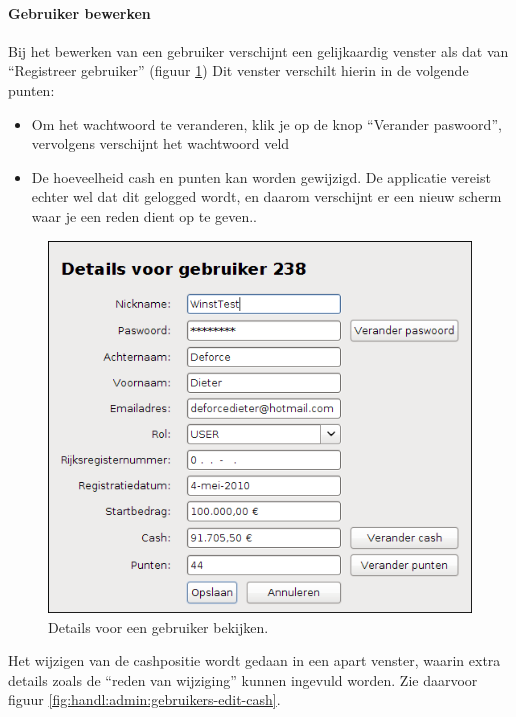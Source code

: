 \paragraph{Gebruiker bewerken}

Bij het bewerken van een gebruiker verschijnt een gelijkaardig venster als dat van ``Registreer gebruiker'' (figuur \ref{fig:handl:admin:gebruikers-edit})
Dit venster verschilt hierin in de volgende punten:

\begin{itemize}
\item{Om het wachtwoord te veranderen, klik je op de knop ``Verander paswoord'', vervolgens verschijnt het wachtwoord veld}
\item{De hoeveelheid cash en punten kan worden gewijzigd. De applicatie vereist echter wel dat dit gelogged wordt, en daarom verschijnt er een nieuw scherm waar je een reden dient op te geven..}
\end{itemize}

\begin{figure}[h!]
	\centering
		\includegraphics[scale=0.75]{images/handleiding/administratie/gebruikers-edit}
	\caption{Details voor een gebruiker bekijken.}
		\label{fig:handl:admin:gebruikers-edit}
\end{figure}

Het wijzigen van de cashpositie wordt gedaan in een apart venster, waarin extra details zoals de ``reden van wijziging'' kunnen ingevuld worden. Zie daarvoor figuur \ref{fig:handl:admin:gebruikers-edit-cash}.

